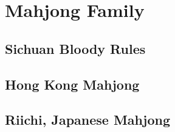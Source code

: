 \chapter{Mahjong Family}

\section{Sichuan Bloody Rules}

\section{Hong Kong Mahjong}

\section{Riichi, Japanese Mahjong}